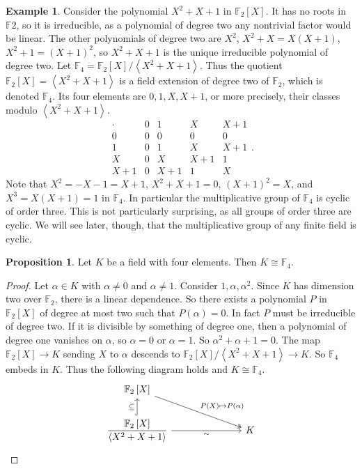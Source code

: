 \documentclass{article}
\newcommand{\F}{\mathbb{F}}
\newcommand{\rb}[1]{\left( #1 \right)}
\renewcommand{\sb}[1]{\left[ #1 \right]}
\newcommand{\ab}[1]{\left\langle #1 \right\rangle}
\theoremstyle{definition}\newtheorem{definition}{Definition}[subsection]
\theoremstyle{definition}\newtheorem{remark}[definition]{Remark}
\theoremstyle{definition}\newtheorem*{example}{Example}
\theoremstyle{definition}\newtheorem*{note}{Note}
\newtheorem{proposition}[definition]{Proposition}
\begin{document}
\begin{example}
Consider the polynomial $ X^2 + X + 1 $ in $ \F_2\sb{X} $. It has no roots in $ \F2 $, so it is irreducible, as a polynomial of degree two any nontrivial factor would be linear. The other polynomials of degree two are $ X^2 $, $ X^2 + X = X\rb{X + 1} $, $ X^2 + 1 = \rb{X + 1}^2 $, so $ X^2 + X + 1 $ is the unique irreducible polynomial of degree two. Let $ \F_4 = \F_2\sb{X} / \ab{X^2 + X + 1} $. Thus the quotient $ \F_2\sb{X} = \ab{X^2 + X + 1} $ is a field extension of degree two of $ \F_2 $, which is denoted $ \F_4 $. Its four elements are $ 0, 1, X, X + 1 $, or more precisely, their classes modulo $ \ab{X^2 + X + 1} $.
$$
\begin{array}{c|cccc}
\cdot & 0 & 1 & X & X + 1 \\
\hline
0 & 0 & 0 & 0 & 0 \\
1 & 0 & 1 & X & X + 1 \\
X & 0 & X & X + 1 & 1 \\
X + 1 & 0 & X + 1 & 1 & X
\end{array}.
$$
Note that $ X^2 = -X - 1 = X + 1 $, $ X^2 + X + 1 = 0 $, $ \rb{X + 1}^2 = X $, and $ X^3 = X\rb{X + 1} = 1 $ in $ \F_4 $. In particular the multiplicative group of $ \F_4 $ is cyclic of order three. This is not particularly surprising, as all groups of order three are cyclic. We will see later, though, that the multiplicative group of any finite field is cyclic.
\end{example}

\begin{proposition}
Let $ K $ be a field with four elements. Then $ K \cong \F_4 $.
\end{proposition}

\begin{proof}
Let $ \alpha \in K $ with $ \alpha \ne 0 $ and $ \alpha \ne 1 $. Consider $ 1, \alpha, \alpha^2 $. Since $ K $ has dimension two over $ \F_2 $, there is a linear dependence. So there exists a polynomial $ P $ in $ \F_2\sb{X} $ of degree at most two such that $ P\rb{\alpha} = 0 $. In fact $ P $ must be irreducible of degree two. If it is divisible by something of degree one, then a polynomial of degree one vanishes on $ \alpha $, so $ \alpha = 0 $ or $ \alpha = 1 $. So $ \alpha^2 + \alpha + 1 = 0 $. The map $ \F_2\sb{X} \to K $ sending $ X $ to $ \alpha $ descends to $ \F_2\sb{X} / \ab{X^2 + X + 1} \to K $. So $ \F_4 $ embeds in $ K $. Thus the following diagram holds and $ K \cong \F_4 $.
$$
\begin{tikzcd}[column sep=1in]
\F_2\sb{X} \arrow[twoheadrightarrow]{dr}{P\rb{X} \mapsto P\rb{\alpha}} & \\
\dfrac{\F_2\sb{X}}{\ab{X^2 + X + 1}} \arrow[hookrightarrow]{u}{\subseteq} \arrow[swap]{r}{\sim} & K
\end{tikzcd}
$$
\end{proof}
\end{document}
